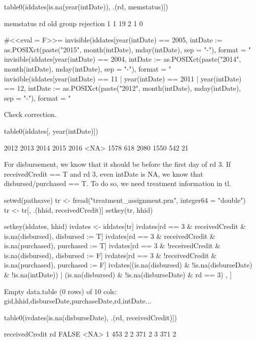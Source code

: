 \begin{Schunk}
\begin{Sinput}
table0(iddates[is.na(year(intDate)), .(rd, memstatus)])
\end{Sinput}
\begin{Soutput}
   memstatus
rd  old group rejection
  1   1              19
  2   1               0
\end{Soutput}
\begin{Sinput}
#<<eval = F>>=
invisible(iddates[year(intDate) == 2005, 
	intDate := as.POSIXct(paste("2015", month(intDate), mday(intDate), sep = "-"), 
	format = "%Y-%m-%d")])
invisible(iddates[year(intDate) == 2004, 
	intDate := as.POSIXct(paste("2014", month(intDate), mday(intDate), sep = "-"), 
	format = "%Y-%m-%d")])
invisible(iddates[year(intDate) == 11 | year(intDate) == 2011 | year(intDate) == 12, 
	intDate := as.POSIXct(paste("2012", month(intDate), mday(intDate), sep = "-"), 
	format = "%Y-%m-%d")])
\end{Sinput}
\end{Schunk}
Check correction.
\begin{Schunk}
\begin{Sinput}
table0(iddates[, year(intDate)])
\end{Sinput}
\begin{Soutput}

2012 2013 2014 2015 2016 <NA> 
1578  618 2080 1550  542   21 
\end{Soutput}
\end{Schunk}
For disbursement, we know that it should be before the first day of rd 3. If \textsf{receivedCredit == T} and rd 3, even \textsf{intDate} is NA, we know that \textsf{disbursed/purchased} == T. To do so, we need treatment information in \textsf{tl}.
\begin{Schunk}
\begin{Sinput}
setwd(pathsave)
tr <- fread("treatment_assignment.prn", integer64 = "double")
tr <- tr[, .(hhid, receivedCredit)]
setkey(tr, hhid)
\end{Sinput}
\end{Schunk}
\begin{Schunk}
\begin{Sinput}
setkey(iddates, hhid)
ivdates <- iddates[tr]
ivdates[rd == 3 & receivedCredit & is.na(disbursed), disbursed := T]
ivdates[rd == 3 & receivedCredit & is.na(purchased), purchased := T]
ivdates[rd == 3 & !receivedCredit & is.na(disbursed), disbursed := F]
ivdates[rd == 3 & !receivedCredit & is.na(purchased), purchased := F]
ivdates[(is.na(disbursed) & !is.na(disburseDate) & !is.na(intDate)) |
	(is.na(disbursed) & !is.na(disburseDate) & rd == 3) , ]
\end{Sinput}
\begin{Soutput}
Empty data.table (0 rows) of 10 cols: gid,hhid,disburseDate,purchaseDate,rd,intDate...
\end{Soutput}
\begin{Sinput}
table0(ivdates[is.na(disburseDate), .(rd, receivedCredit)])
\end{Sinput}
\begin{Soutput}
   receivedCredit
rd  FALSE <NA>
  1   453    2
  2   371    2
  3   371    2
\end{Soutput}
\end{Schunk}
